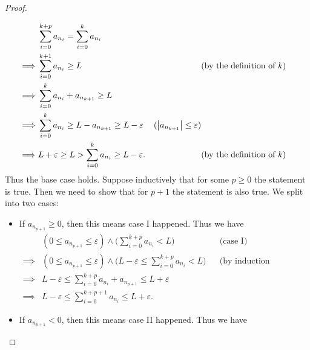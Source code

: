 \begin{proof}
\begin{itemize}
\begin{align*}
                     & \sum_{i = 0}^{k + p} a_{n_i} = \sum_{i = 0}^k a_{n_i}                                                                                                \\
            \implies & \sum_{i = 0}^{k + 1} a_{n_i} \geq L                                   &                                        & \text{(by the definition of \(k\))} \\
            \implies & \sum_{i = 0}^k a_{n_i} + a_{n_{k + 1}} \geq L                                                                                                        \\
            \implies & \sum_{i = 0}^k a_{n_i} \geq L - a_{n_{k + 1}} \geq L - \varepsilon    & (\left\lvert a_{n_{k + 1}}\right\rvert \leq \varepsilon)                                       \\
            \implies & L + \varepsilon \geq L > \sum_{i = 0}^k a_{n_i} \geq L - \varepsilon. &                                        & \text{(by the definition of \(k\))}
          \end{align*}
          Thus the base case holds.
          Suppose inductively that for some \(p \geq 0\) the statement is true.
          Then we need to show that for \(p + 1\) the statement is also true.
          We split into two cases:
          \begin{itemize}
            \item If \(a_{n_{p + 1}} \geq 0\), then this means case I happened.
                  Thus we have
                  \begin{align*}
                             & (0 \leq a_{n_{p + 1}} \leq \varepsilon) \land \Bigg(\sum_{i = 0}^{k + p} a_{n_i} < L\Bigg)                      &  & \text{(case I)}                  \\
                    \implies & (0 \leq a_{n_{p + 1}} \leq \varepsilon) \land \Bigg(L - \varepsilon \leq \sum_{i = 0}^{k + p} a_{n_i} < L\Bigg) &  & \text{(by induction hypothesis)} \\
                    \implies & L - \varepsilon \leq \sum_{i = 0}^{k + p} a_{n_i} + a_{n_{p + 1}} \leq L + \varepsilon                                                                \\
                    \implies & L - \varepsilon \leq \sum_{i = 0}^{k + p + 1} a_{n_i} \leq L + \varepsilon.
                  \end{align*}
            \item If \(a_{n_{p + 1}} < 0\), then this means case II happened.
                  Thus we have

\end{itemize}
\end{itemize}
\end{proof}
